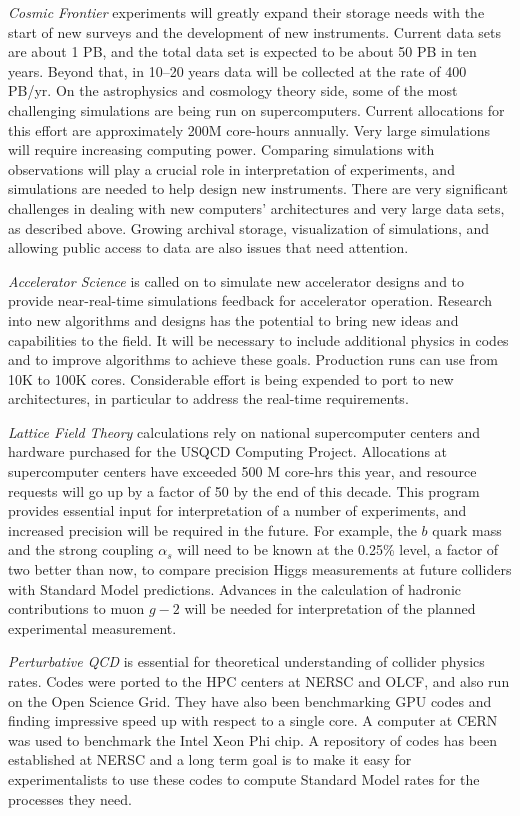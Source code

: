 {\it Cosmic Frontier} experiments will greatly expand their storage needs
with the start of new surveys and the development of new instruments.
Current data sets are about 1 PB, and the total data set is expected to be
about 50 PB in ten years. Beyond that, in 10--20 years data will be
collected at the rate of 400 PB/yr. On the astrophysics and cosmology
theory side, some of the most challenging simulations are being run on
supercomputers. 
Current allocations for this effort are approximately 200M core-hours annually.
Very large simulations will require increasing computing
power. Comparing simulations with observations will play a crucial role in
interpretation of experiments, and simulations are needed to help design
new instruments. There are very significant challenges in dealing with new
computers' architectures and very large data sets, as described above.
Growing archival storage, visualization of simulations, and allowing public
access to data are also issues that need attention.

{\it Accelerator Science} is called on to simulate new accelerator designs
and to provide near-real-time simulations feedback for accelerator
operation. 
Research into new algorithms and designs has the potential to bring new ideas and
capabilities to the field.
It will be necessary to include additional physics in codes and
to improve algorithms to achieve these goals. Production runs can use from
10K to 100K cores. Considerable effort is being expended to port to new
architectures, in particular to address the real-time requirements.

{\it Lattice Field Theory} calculations rely on national supercomputer
centers and hardware purchased for the USQCD Computing Project. Allocations
at supercomputer centers have exceeded 500 M core-hrs this year, and
resource requests will go up by a factor of 50 by the end of this decade.
This program provides essential input for interpretation of a number of
experiments, and increased precision will be required in the future. For
example, the $b$ quark mass and the strong coupling $\alpha_s$ will need to
be known at the 0.25\% level, a factor of two better than now, to compare
precision Higgs measurements at future colliders with 
Standard Model predictions.  Advances
in the calculation of hadronic contributions to muon $g-2$ will be needed
for interpretation of the planned experimental measurement.

{\it Perturbative QCD} is essential for theoretical understanding of
collider physics rates. Codes were ported to the HPC centers at NERSC and
OLCF, and also run on the Open Science Grid. They have also been
benchmarking GPU codes and finding impressive speed up with respect to
 a single core.
A computer at CERN was used to benchmark the Intel Xeon Phi chip.
A repository of codes has been established at NERSC and a long term goal is
to make it easy for experimentalists to use these codes to compute Standard
Model rates for the processes they need.

